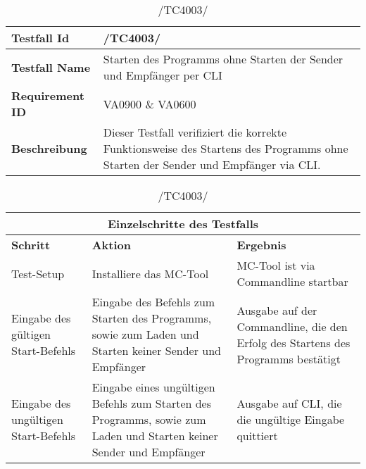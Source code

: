 \begin{table}[h]
\caption{/TC4003/}
\label{tab:TC4003}
\begin{center}
\begin{tabular}{|p{3.5cm}|p{9cm}|}
\hline
\textbf{Testfall Id} & /TC4003/\\
\hline
\textbf{Testfall Name} & Starten des Programms ohne Starten der Sender und
Empfänger per CLI\\
\hline
\textbf{Requirement ID} & VA0900 \& VA0600\\
\hline
\textbf{Beschreibung} & Dieser Testfall verifiziert die korrekte
Funktionsweise des Startens des Programms ohne Starten der Sender und
Empfänger via CLI.\\
\hline
\end{tabular}
\begin{tabular}{|p{2.5cm}|p{5cm}|p{4.55cm}|}
\multicolumn{3}{|c|}{\textbf{Einzelschritte des Testfalls}} \\
\hline
\textbf{Schritt} & \textbf{Aktion} & \textbf{Ergebnis}\\
\hline
Test-Setup & Installiere das MC-Tool & MC-Tool ist via
Commandline startbar\\
\hline
Eingabe des gültigen Start-Befehls & Eingabe des Befehls zum Starten des
Programms, sowie zum Laden und Starten keiner Sender und Empfänger & Ausgabe auf
der Commandline, die den Erfolg des Startens des Programms bestätigt
\\
\hline
Eingabe des ungültigen Start-Befehls & Eingabe eines ungültigen Befehls zum
Starten des Programms, sowie zum Laden und Starten keiner Sender und Empfänger &
Ausgabe auf CLI, die die ungültige Eingabe quittiert
\\
\hline
\end{tabular}
\end{center}
\label{default}
\end{table}


